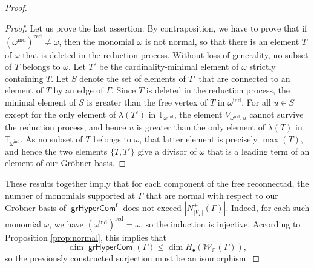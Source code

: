 \documentclass[11pt]{article}
\theoremstyle{definition}
\numberwithin{equation}{section}
\newcommand\calW{\mathcal{W}}
\DeclareMathOperator{\grHyperCom}{\mathsf{grHyperCom}}
\begin{document}
\begin{proof}
\begin{proof}
Let us prove the last assertion. By contraposition, we have to prove that if $(\omega^{\mathrm{ind}})^{\mathrm{red}}\neq\omega$, then the monomial $\omega$ is not normal, so that there is an element $T$ of $\omega$ that is deleted in the reduction process. Without loss of generality, no subset of $T$ belongs to $\omega$. Let $T'$ be the cardinality-minimal element of $\omega$ strictly containing $T$. Let $S$ denote  the set of elements of $T'$ that are connected to an element of $T$ by an edge of $\Gamma$. Since $T$ is deleted in the reduction process, the minimal element of $S$ is greater than the free vertex of $T$ in $\omega^{\mathrm{ind}}$. For all $u\in S$ except for the only element of $\lambda(T')$ in $\mathbb{T}_{\omega^{\mathrm{ind}}}$, the element $V_{\omega^{\mathrm{ind}},u}$ cannot survive the reduction process, and hence $u$ is greater than the only element of $\lambda(T)$ in $\mathbb{T}_{\omega^{\mathrm{ind}}}$. As no subset of $T$ belongs to $\omega$, that latter element is precisely $\max(T)$, and hence the two elements $\{T,T'\}$ give a divisor of $\omega$ that is a leading term of an element of our Gr\"obner basis. 
\end{proof}

These results together imply that for each component of the free reconnectad, the number of monomials supported at $\Gamma$ that are normal with respect to our Gr\"obner basis of $\grHyperCom^{\mathsf{f}}$ does not exceed $|N^+_{|V_\Gamma|}(\Gamma)|$. Indeed, for each such monomial $\omega$,
we have $(\omega^{\mathrm{ind}})^{\mathrm{red}}=\omega$, so the induction is injective. According to Proposition \ref{prop:normal}, this implies that
 \[
\dim \grHyperCom(\Gamma) \leq \dim H_{\bullet}(\calW_{\mathbb{C}}(\Gamma)),
 \]
so the previously constructed surjection must be an isomorphism. 
\end{proof}
\end{document}
